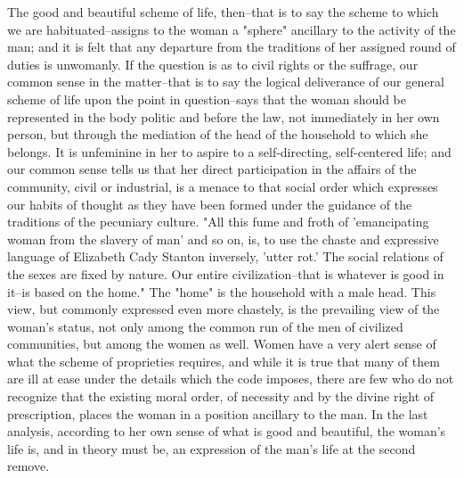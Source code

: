 \documentclass[12pt]{report}
\begin{document}
The good and beautiful scheme of life, then--that is to say the scheme
to which we are habituated--assigns to the woman a "sphere" ancillary
to the activity of the man; and it is felt that any departure from the
traditions of her assigned round of duties is unwomanly. If the
question is as to civil rights or the suffrage, our common sense in the
matter--that is to say the logical deliverance of our general scheme
of life upon the point in question--says that the woman should be
represented in the body politic and before the law, not immediately in
her own person, but through the mediation of the head of the
household to which she belongs. It is unfeminine in her to aspire to a
self-directing, self-centered life; and our common sense tells us that
her direct participation in the affairs of the community, civil or
industrial, is a menace to that social order which expresses our habits
of thought as they have been formed under the guidance of the traditions
of the pecuniary culture. "All this fume and froth of 'emancipating
woman from the slavery of man' and so on, is, to use the chaste and
expressive language of Elizabeth Cady Stanton inversely, 'utter rot.'
The social relations of the sexes are fixed by nature. Our entire
civilization--that is whatever is good in it--is based on the home."
The "home" is the household with a male head. This view, but commonly
expressed even more chastely, is the prevailing view of the woman's
status, not only among the common run of the men of civilized
communities, but among the women as well. Women have a very alert sense
of what the scheme of proprieties requires, and while it is true that
many of them are ill at ease under the details which the code imposes,
there are few who do not recognize that the existing moral order, of
necessity and by the divine right of prescription, places the woman in
a position ancillary to the man. In the last analysis, according to her
own sense of what is good and beautiful, the woman's life is, and in
theory must be, an expression of the man's life at the second remove.
\end{document}
